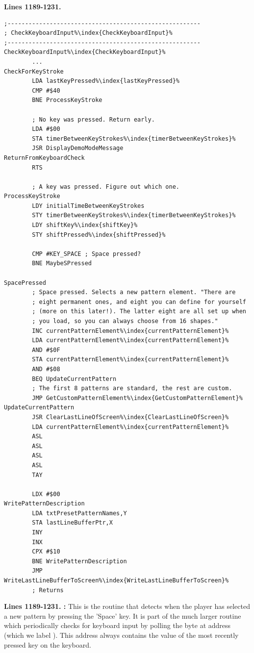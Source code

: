 \clearpage
\textbf{Lines 1189-1231. } 
\begin{lstlisting}[basicstyle=\ttfamily\scriptsize,escapechar=\%]
;-------------------------------------------------------
; CheckKeyboardInput%\index{CheckKeyboardInput}%
;-------------------------------------------------------
CheckKeyboardInput%\index{CheckKeyboardInput}%   
        ...
CheckForKeyStroke   
        LDA lastKeyPressed%\index{lastKeyPressed}%
        CMP #$40
        BNE ProcessKeyStroke

        ; No key was pressed. Return early.
        LDA #$00
        STA timerBetweenKeyStrokes%\index{timerBetweenKeyStrokes}%
        JSR DisplayDemoModeMessage
ReturnFromKeyboardCheck   
        RTS 

        ; A key was pressed. Figure out which one.
ProcessKeyStroke   
        LDY initialTimeBetweenKeyStrokes
        STY timerBetweenKeyStrokes%\index{timerBetweenKeyStrokes}%
        LDY shiftKey%\index{shiftKey}%
        STY shiftPressed%\index{shiftPressed}%

        CMP #KEY_SPACE ; Space pressed?
        BNE MaybeSPressed

SpacePressed
        ; Space pressed. Selects a new pattern element. "There are
        ; eight permanent ones, and eight you can define for yourself
        ; (more on this later!). The latter eight are all set up when
        ; you load, so you can always choose from 16 shapes."
        INC currentPatternElement%\index{currentPatternElement}%
        LDA currentPatternElement%\index{currentPatternElement}%
        AND #$0F
        STA currentPatternElement%\index{currentPatternElement}%
        AND #$08
        BEQ UpdateCurrentPattern
        ; The first 8 patterns are standard, the rest are custom.
        JMP GetCustomPatternElement%\index{GetCustomPatternElement}%
UpdateCurrentPattern   
        JSR ClearLastLineOfScreen%\index{ClearLastLineOfScreen}%
        LDA currentPatternElement%\index{currentPatternElement}%
        ASL 
        ASL 
        ASL 
        ASL 
        TAY 

        LDX #$00
WritePatternDescription   
        LDA txtPresetPatternNames,Y
        STA lastLineBufferPtr,X
        INY 
        INX 
        CPX #$10
        BNE WritePatternDescription
        JMP WriteLastLineBufferToScreen%\index{WriteLastLineBufferToScreen}%
        ; Returns
\end{lstlisting}
\clearpage

\textbf{Lines 1189-1231. :} This is the routine that detects when the player has selected a new
pattern by pressing the 'Space' key. It is part of the much larger routine  which periodically checks
for keyboard input by polling the byte at address  (which we label ). This address always
contains the value of the most recently pressed key on the keyboard.

